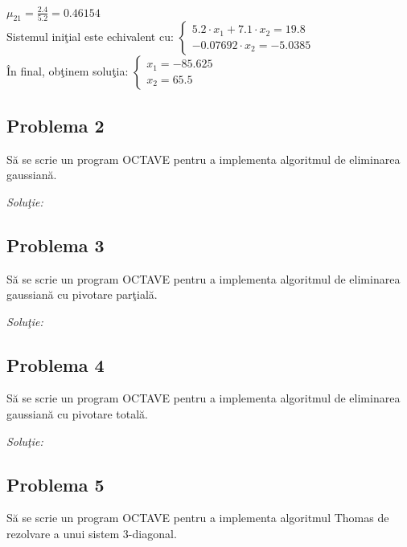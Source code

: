 \documentclass{exam}
\newcommand{\octavescript}[2]{
	
}
\begin{document}
$\mu_{21} = \frac{2.4}{5.2} = 0.46154$\\

Sistemul ini\c{t}ial este echivalent cu:
$\displaystyle
	\begin{cases} 5.2 \cdot x_1 + 7.1 \cdot x_2 = 19.8 \\
		-0.07692 \cdot x_2 = -5.0385
	\end{cases}$\\

În final, ob\c{t}inem solu\c{t}ia:
$\displaystyle \begin{cases} x_1 = -85.625 \\ x_2 = 65.5\end{cases}$\\



\subsection{Problema 2}
Să se scrie un program OCTAVE pentru a implementa algoritmul de eliminarea gaussian\u{a}.

\textit{Soluţie:}

\octavescript{./src/G.m}{}

\subsection{Problema 3}
Să se scrie un program OCTAVE pentru a implementa algoritmul de eliminarea gaussian\u{a} cu pivotare par\c{t}ial\u{a}.

\textit{Soluţie:}

\octavescript{./src/GPP.m}{}

\subsection{Problema 4}
Să se scrie un program OCTAVE pentru a implementa algoritmul de eliminarea gaussian\u{a} cu pivotare total\u{a}.

\textit{Soluţie:}

\octavescript{./src/GPT.m}{}


\subsection{Problema 5}
Să se scrie un program OCTAVE pentru a implementa algoritmul Thomas de rezolvare a unui sistem 3-diagonal.
\end{document}
